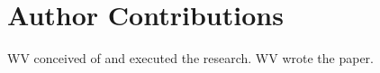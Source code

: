 \documentclass[conference]{IEEEtran}
\begin{document}



\section*{Author Contributions}
WV conceived of and executed the research. WV wrote the paper.






\end{document}
